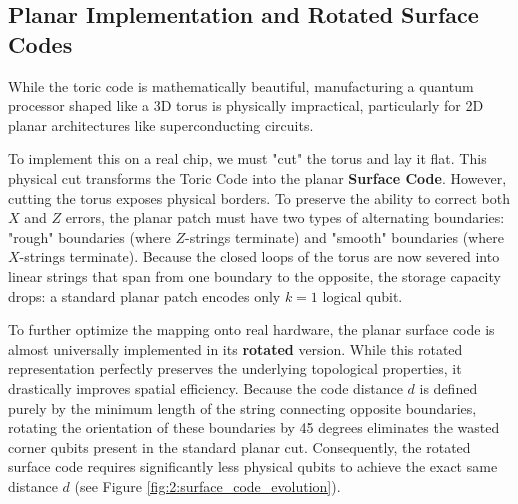 \subsection{Planar Implementation and Rotated Surface Codes}
While the toric code is mathematically beautiful, manufacturing a quantum processor shaped like a 3D torus is physically impractical, particularly for 2D planar architectures like superconducting circuits. 

To implement this on a real chip, we must "cut" the torus and lay it flat. This physical cut transforms the Toric Code into the planar \textbf{Surface Code}. However, cutting the torus exposes physical borders. To preserve the ability to correct both $X$ and $Z$ errors, the planar patch must have two types of alternating boundaries: "rough" boundaries (where $Z$-strings terminate) and "smooth" boundaries (where $X$-strings terminate). Because the closed loops of the torus are now severed into linear strings that span from one boundary to the opposite, the storage capacity drops: a standard planar patch encodes only $k=1$ logical qubit.

To further optimize the mapping onto real hardware, the planar surface code is almost universally implemented in its \textbf{rotated} version. While this rotated representation perfectly preserves the underlying topological properties, it drastically improves spatial efficiency. Because the code distance $d$ is defined purely by the minimum length of the string connecting opposite boundaries, rotating the orientation of these boundaries by 45 degrees eliminates the wasted corner qubits present in the standard planar cut. Consequently, the rotated surface code requires significantly less physical qubits to achieve the exact same distance $d$ (see Figure \ref{fig:2:surface_code_evolution}).

